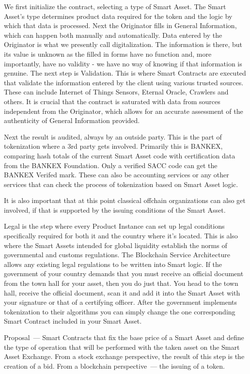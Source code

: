 \documentclass{article}
\begin{document}
\begin{multicols}{2}
We first initialize the contract, selecting a type of Smart Asset. The Smart Asset’s type determines product data required for the token and the logic by which that data is processed. 
Next the Originator fills in General Information, which can happen both manually and automatically. Data entered by the Originator is what we presently call digitalization. The information is there, but its value is unknown as the filled in forms have no function and, more importantly, have no validity - we have no way of knowing if that information is genuine. 
The next step is Validation. This is where Smart Contracts are executed that validate the information entered by the client using various trusted sources. These can include Internet of Things Sensors, Eternal Oracle, Crawlers and others. It is crucial that the contract is saturated with data from sources independent from the Originator, which allows for an accurate assessment of the authenticity of General Information provided. 

Next the result is audited, always by an outside party. This is the part of tokenization where a 3rd party gets involved. Primarily this is BANKEX, comparing hash totals of the current Smart Asset code with certification data from the BANKEX Foundation. Only a verified SACC code can get the BANKEX Verifed mark. These can also be accounting services or any other services that can check the process of tokenization based on Smart Asset logic.

It is also important that at this point classical offchain organizations can also get involved, if that is supported by the issuing conditions of the Smart Asset. 

Legal is the step where every Product Instance can set up legal conditions specifically required for both it and the country where it's located. This is also where the Smart Assets intended for global liquidity establish the norms of governmental and customs regulations. The Blockchain Service Architecture allows any existing legal regulations to be written into Smart logic. If the government of your country demands that you must receive an official document from the town hall for your asset, then you do just that. You head to the town hall, receive the official document, scan it and add it into the Smart Asset with your signature or that of a certifying officer. After the government implements tokenization to their algorithms you can simply change the one corresponding Smart Contract included in your Smart Asset. 

Proposal~--- Smart Contracts that fix the base price of a Smart Asset and define the type of operation that will be performed with the taken asset on the Smart Asset Exchange. From a stock exchange perspective, the result of this step is the creation of a bid. From a blockchain perspective~--- the issuing of a token.


\end{multicols}
\end{document}
